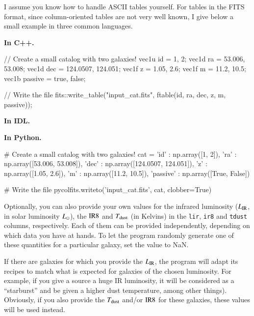 I assume you know how to handle ASCII tables yourself. For tables in the FITS format, since column-oriented tables are not very well known, I give below a small example in three common languages.

{\bf In C++.}
\begin{cppcode}
// Create a small catalog with two galaxies!
vec1u id      = {1,        2};
vec1d ra      = {53.006,   53.008};
vec1d dec     = {124.0507, 124.051};
vec1f z       = {1.05,     2.6};
vec1f m       = {11.2,     10.5};
vec1b passive = {true,     false};

// Write the file
fits::write_table("input_cat.fits", ftable(id, ra, dec, z, m, passive));
\end{cppcode}

{\bf In IDL.}

{\bf In Python.}
\begin{pythoncode}
# Create a small catalog with two galaxies!
cat = {
    'id'      : np.array([1,        2]),
    'ra'      : np.array([53.006,   53.008]),
    'dec'     : np.array([124.0507, 124.051]),
    'z'       : np.array([1.05,     2.6]),
    'm'       : np.array([11.2,     10.5]),
    'passive' : np.array([True,     False])
}

# Write the file
pycolfits.writeto('input_cat.fits', cat, clobber=True)
\end{pythoncode}

Optionally, you can also provide your own values for the infrared luminosity ($L_{\rm IR}$, in solar luminosity $L_\odot$), the ${\rm IR8}$ and $T_{\rm dust}$ (in Kelvins) in the \texttt{lir}, \texttt{ir8} and \texttt{tdust} columns, respectively. Each of them can be provided independently, depending on which data you have at hands. To let the program randomly generate one of these quantities for a particular galaxy, set the value to NaN.

If there are galaxies for which you provide the $L_{\rm IR}$, the program will adapt its recipes to match what is expected for galaxies of the chosen luminosity. For example, if you give a source a huge IR luminosity, it will be considered as a ``starburst'' and be given a higher dust temperature, among other things). Obviously, if you also provide the $T_{\rm dust}$ and/or ${\rm IR8}$ for these galaxies, these values will be used instead.

